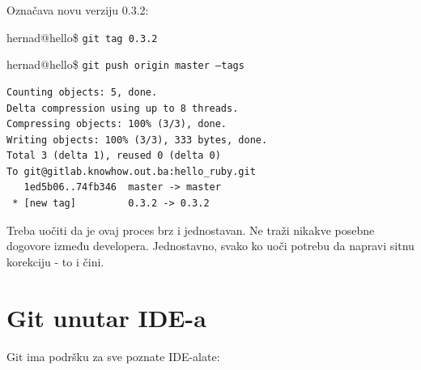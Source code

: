 \documentclass[times, utf8, seminar]{fit}
\begin{document}
Označava novu verziju 0.3.2:

hernad@hello\ruby\$ \texttt{git tag 0.3.2}

hernad@hello\ruby\$ \texttt{git push origin master --tags}
\begin{lstlisting}
Counting objects: 5, done.
Delta compression using up to 8 threads.
Compressing objects: 100% (3/3), done.
Writing objects: 100% (3/3), 333 bytes, done.
Total 3 (delta 1), reused 0 (delta 0)
To git@gitlab.knowhow.out.ba:hello_ruby.git
   1ed5b06..74fb346  master -> master
 * [new tag]         0.3.2 -> 0.3.2
\end{lstlisting}

Treba uočiti da je ovaj proces brz i jednostavan. Ne traži nikakve posebne dogovore između developera.
Jednostavno, svako ko uoči potrebu da napravi sitnu korekciju - to i čini.

\chapter{Git unutar IDE-a}

Git ima podršku za sve poznate IDE-alate:
\end{document}
